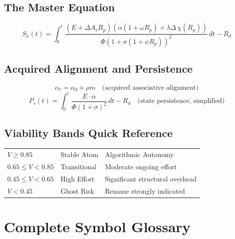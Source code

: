 \documentclass[12pt, openany]{book}
\theoremstyle{thmstyle}
\theoremstyle{defstyle}
\begin{document}
\section*{The Master Equation}

\begin{masterbox}
\[
S_x(t) = \int_0^t
\frac{(E + \Delta A_r R_p)(\alpha(1+\omega R_p)+\lambda\Delta\,\chi(R_p))}
{\Phi(1+\sigma(1+\psi R_p))^2}
\,dt - R_d
\]
\end{masterbox}

\section*{Acquired Alignment and Persistence}

\[
\alpha_t = \alpha_0 + \rho m \quad \text{(acquired associative alignment)}
\]
\[
P_s(t) = \int_0^t \frac{E\cdot\alpha}{\Phi(1+\sigma)^2}\,dt - R_d \quad \text{(state persistence, simplified)}
\]

\section*{Viability Bands Quick Reference}

\begin{center}
\begin{tabular}{lll}
\toprule
$V \geq 0.85$ & Stable Atom & Algorithmic Autonomy \\
$0.65 \leq V < 0.85$ & Transitional & Moderate ongoing effort \\
$0.45 \leq V < 0.65$ & High Effort & Significant structural overhead \\
$V < 0.45$ & Ghost Risk & Rename strongly indicated \\
\bottomrule
\end{tabular}
\end{center}

\chapter{Complete Symbol Glossary}
\end{document}
